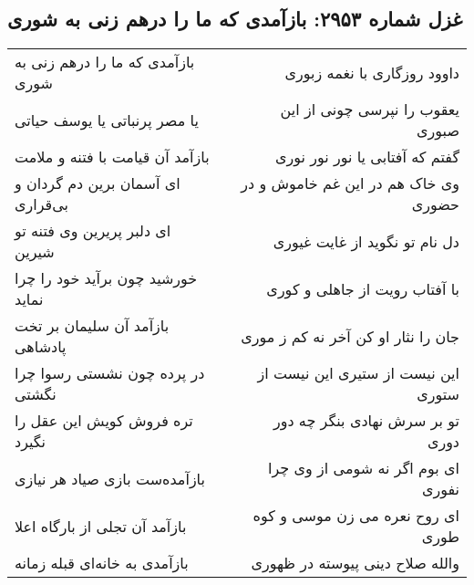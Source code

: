 \begin{center}
\section*{غزل شماره ۲۹۵۳: بازآمدی که ما را درهم زنی به شوری}
\label{sec:2953}
\begin{longtable}{l p{0.5cm} r}
بازآمدی که ما را درهم زنی به شوری
&&
داوود روزگاری با نغمه زبوری
\\
یا مصر پرنباتی یا یوسف حیاتی
&&
یعقوب را نپرسی چونی از این صبوری
\\
بازآمد آن قیامت با فتنه و ملامت
&&
گفتم که آفتابی یا نور نور نوری
\\
ای آسمان برین دم گردان و بی‌قراری
&&
وی خاک هم در این غم خاموش و در حضوری
\\
ای دلبر پریرین وی فتنه تو شیرین
&&
دل نام تو نگوید از غایت غیوری
\\
خورشید چون برآید خود را چرا نماید
&&
با آفتاب رویت از جاهلی و کوری
\\
بازآمد آن سلیمان بر تخت پادشاهی
&&
جان را نثار او کن آخر نه کم ز موری
\\
در پرده چون نشستی رسوا چرا نگشتی
&&
این نیست از ستیری این نیست از ستوری
\\
تره فروش کویش این عقل را نگیرد
&&
تو بر سرش نهادی بنگر چه دور دوری
\\
بازآمده‌ست بازی صیاد هر نیازی
&&
ای بوم اگر نه شومی از وی چرا نفوری
\\
بازآمد آن تجلی از بارگاه اعلا
&&
ای روح نعره می زن موسی و کوه طوری
\\
بازآمدی به خانه‌ای قبله زمانه
&&
والله صلاح دینی پیوسته در ظهوری
\\
\end{longtable}
\end{center}
